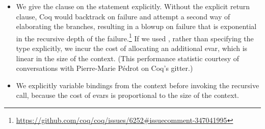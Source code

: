 \begin{itemize}
\item  We give the  clause on the  statement explicitly.
      Without the explicit return clause, Coq would backtrack on
      failure and attempt a second way of elaborating the 
      branches, resulting in a blowup on failure that is exponential
      in the recursive depth of the
      failure.\footnote{\url{https://github.com/coq/coq/issues/6252\#issuecomment-347041995}}
      If we used  \coqdocvar{\_}, rather than specifying the type
      explicitly, we incur the cost of allocating an additional evar,
      which is linear in the size of the context.  (This performance
      statistic courtesy of conversations with Pierre-Marie Pédrot on
      Coq's gitter.)



\item  We explicitly  variable bindings from the context before
      invoking the recursive call, because the cost of evars is
      proportional to the size of the context.  
\end{itemize}
